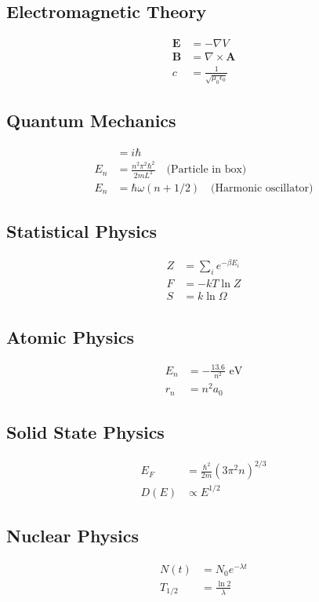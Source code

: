 \documentclass[12pt,a4paper]{article}
\begin{document}
\subsection*{Electromagnetic Theory}
\begin{align}
\mathbf{E} &= -\nabla V\\
\mathbf{B} &= \nabla \times \mathbf{A}\\
c &= \frac{1}{\sqrt{\mu_0\epsilon_0}}
\end{align}

\subsection*{Quantum Mechanics}
\begin{align}
[\hat{x}, \hat{p}] &= i\hbar\\
E_n &= \frac{n^2\pi^2\hbar^2}{2mL^2} \quad \text{(Particle in box)}\\
E_n &= \hbar\omega(n + 1/2) \quad \text{(Harmonic oscillator)}
\end{align}

\subsection*{Statistical Physics}
\begin{align}
Z &= \sum_i e^{-\beta E_i}\\
F &= -kT\ln Z\\
S &= k\ln\Omega
\end{align}

\subsection*{Atomic Physics}
\begin{align}
E_n &= -\frac{13.6}{n^2} \text{ eV}\\
r_n &= n^2 a_0
\end{align}

\subsection*{Solid State Physics}
\begin{align}
E_F &= \frac{\hbar^2}{2m}(3\pi^2 n)^{2/3}\\
D(E) &\propto E^{1/2}
\end{align}

\subsection*{Nuclear Physics}
\begin{align}
N(t) &= N_0 e^{-\lambda t}\\
T_{1/2} &= \frac{\ln 2}{\lambda}
\end{align}
\end{document}
